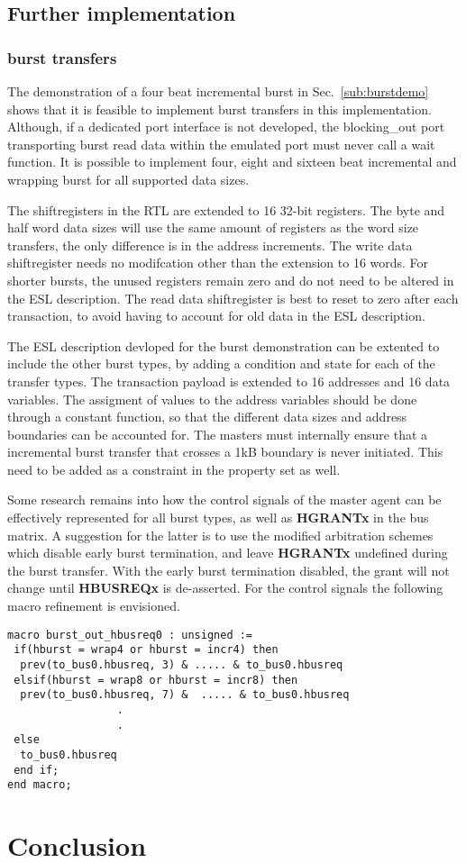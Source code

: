 \subsection{Further implementation}
\label{sec:furth}
\subsubsection{burst transfers}
The demonstration of a four beat incremental burst in Sec.~\ref{sub:burstdemo} shows that it is feasible to implement burst transfers in this implementation. Although, if a dedicated port interface is not developed, the blocking\_out port transporting burst read data within the emulated port must never call a wait function. It is possible to implement four, eight and sixteen beat incremental and wrapping burst for all supported data sizes. \par
The shiftregisters in the RTL are extended to 16 32-bit registers. The byte and half word data sizes will use the same amount of registers as the word size transfers, the only difference is in the address increments. The write data shiftregister needs no modifcation other than the extension to 16 words. For shorter bursts, the unused registers remain zero and do not need to be altered in the ESL description. The read data shiftregister is best to reset to zero after each transaction, to avoid having to account for old data in the ESL description. \par
The ESL description devloped for the burst demonstration can be extented to include the other burst types, by adding a condition and state for each of the transfer types. The transaction payload is extended to 16 addresses and 16 data variables. The assigment of values to the address variables should be done through a constant function, so that the different data sizes and address boundaries can be accounted for. The masters must internally ensure that a incremental burst transfer that crosses a 1kB boundary is never initiated. This need to be added as a constraint in the property set as well. \par
Some research remains into how the control signals of the master agent can be effectively represented for all burst types, as well as \textbf{HGRANTx} in the bus matrix. A suggestion for the latter is to use the modified arbitration schemes which disable early burst termination, and leave \textbf{HGRANTx} undefined during the burst transfer. With the early burst termination disabled, the grant will not change until \textbf{HBUSREQx} is de-asserted. For the control signals the following macro refinement is envisioned.
\begin{lstlisting}
macro burst_out_hbusreq0 : unsigned :=
 if(hburst = wrap4 or hburst = incr4) then
  prev(to_bus0.hbusreq, 3) & ..... & to_bus0.hbusreq
 elsif(hburst = wrap8 or hburst = incr8) then
  prev(to_bus0.hbusreq, 7) &  ..... & to_bus0.hbusreq
                 .
                 .
 else 
  to_bus0.hbusreq
 end if;
end macro;
\end{lstlisting}  




\section{Conclusion}
\label{sec:concl}
